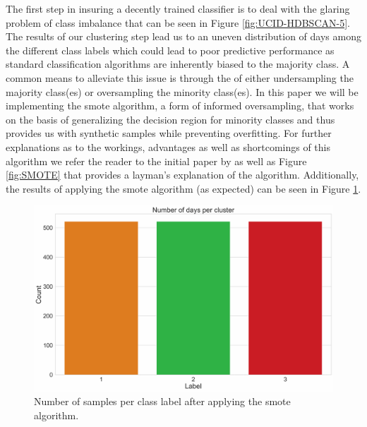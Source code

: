 \noindent \newline The first step in insuring a decently trained classifier is to deal with the glaring problem of class imbalance that can be seen in Figure \ref{fig:UCID-HDBSCAN-5}. The results of our clustering step lead us to an uneven distribution of days among the different class labels which could lead to poor predictive performance as standard classification algorithms are inherently biased to the majority class. A common means to alleviate this issue is through the of either undersampling the majority class(es) or oversampling the minority class(es). In this paper we will be implementing the \gls{smote} algorithm, a form of informed oversampling, that works on the basis of generalizing the decision region for minority classes and thus provides us with synthetic samples while preventing overfitting. For further explanations as to the workings, advantages as well as shortcomings of this algorithm we refer the reader to the initial paper by \citet{Chawla} as well as Figure \ref{fig:SMOTE} that provides a layman's explanation of the algorithm. Additionally, the results of applying the \gls{smote} algorithm (as expected) can be seen in Figure \ref{fig:UCID-SMOTENC}.

\begin{figure}[H]
    \centering
    \includegraphics[width=\textwidth]{Images/Chapter 6/Stage 4/UCID/UCID-SMOTENC.pdf}
    \caption{Number of samples per class label after applying the \gls{smote} algorithm.}
    \label{fig:UCID-SMOTENC}
\end{figure}

